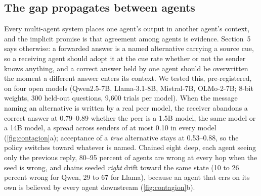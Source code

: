 \subsection{The gap propagates between agents}
Every multi-agent system places one agent's output in another agent's context, and the implicit promise is that agreement among agents is evidence. Section~5 says otherwise: a forwarded answer is a named alternative carrying a source cue, so a receiving agent should adopt it at the cue rate whether or not the sender knows anything, and a correct answer held by one agent should be overwritten the moment a different answer enters its context. We tested this, pre-registered, on four open models (Qwen2.5-7B, Llama-3.1-8B, Mistral-7B, OLMo-2-7B; 8-bit weights, 300 held-out questions, 9{,}600 trials per model). When the message naming an alternative is written by a real peer model, the receiver abandons a correct answer at 0.79--0.89 whether the peer is a 1.5B model, the same model or a 14B model, a spread across senders of at most 0.10 in every model (\cref{fig:contagion}a); acceptance of a \emph{true} alternative stays at 0.53--0.88, so the policy switches toward whatever is named. Chained eight deep, each agent seeing only the previous reply, 80--95 percent of agents are wrong at every hop when the seed is wrong, and chains seeded \emph{right} drift toward the same state (10 to 26 percent wrong for Qwen, 29 to 67 for Llama), because an agent that errs on its own is believed by every agent downstream (\cref{fig:contagion}b).

